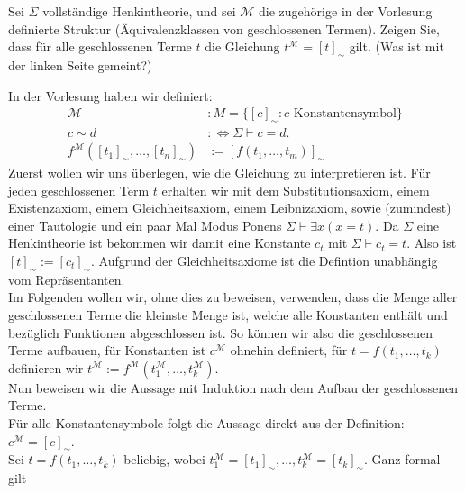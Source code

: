 
\begin{exercise}[118]

Sei $\Sigma$ vollständige Henkintheorie, und sei $\mathscr{M}$ die zugehörige
in der Vorlesung definierte Struktur (Äquivalenzklassen von geschlossenen Termen).
Zeigen Sie, dass für alle geschlossenen Terme $t$ die Gleichung $t^{\mathscr{M}} = [t]_{\sim}$
gilt. (Was ist mit der linken Seite gemeint?)

\end{exercise}


\begin{solution}
In der Vorlesung haben wir definiert:
\begin{align*}
  \mathscr{M}&: M = \{[c]_{\sim}: c \text{ Konstantensymbol} \} \\
  c \sim d &:\iff \Sigma \vdash c = d. \\
  f^\mathscr{M}([t_1]_\sim, \dots, [t_n]_\sim) &:= [f(t_1, \dots, t_m)]_\sim
\end{align*}
Zuerst wollen wir uns überlegen, wie die Gleichung zu interpretieren ist. Für jeden geschlossenen Term $t$ erhalten wir mit dem Substitutionsaxiom, einem Existenzaxiom, einem Gleichheitsaxiom, einem Leibnizaxiom, sowie (zumindest) einer Tautologie und ein paar Mal Modus Ponens $\Sigma \vdash \exists x(x = t)$. Da $\Sigma$ eine Henkintheorie ist bekommen wir damit eine Konstante $c_t$ mit $\Sigma \vdash c_t = t$. Also ist $[t]_\sim := [c_t]_\sim$. Aufgrund der Gleichheitsaxiome ist die Defintion unabhängig vom Repräsentanten. \\
Im Folgenden wollen wir, ohne dies zu beweisen, verwenden, dass die Menge aller geschlossenen Terme die kleinste Menge ist, welche alle Konstanten enthält und bezüglich Funktionen abgeschlossen ist. So können wir also die geschlossenen Terme aufbauen, für Konstanten ist $c^\mathscr{M}$ ohnehin definiert, für $t = f(t_1, \dots, t_k)$ definieren wir $t^\mathscr{M} := f^\mathscr{M}(t_1^\mathscr{M}, \dots, t_k^\mathscr{M})$.  \\
Nun beweisen wir die Aussage mit Induktion nach dem Aufbau der geschlossenen Terme. \\
Für alle Konstantensymbole folgt die Aussage direkt aus der Definition: $c^{\mathscr{M}} = [c]_{\sim}$. \\
Sei $t = f(t_1,\dots,t_k)$ beliebig, wobei $t_1^\mathscr{M} = [t_1]_\sim, \dots, t_k^\mathscr{M} = [t_k]_\sim$. Ganz formal gilt 

\end{solution}
